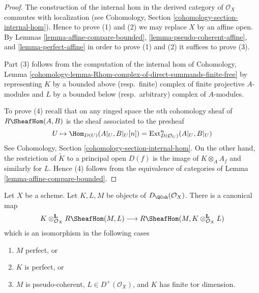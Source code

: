 \begin{proof}
The construction of the internal hom in the derived category of
$\mathcal{O}_X$ commutes with localization (see
Cohomology, Section \ref{cohomology-section-internal-hom}).
Hence to prove (1) and (2) we may replace $X$ by an affine open.
By Lemmas \ref{lemma-affine-compare-bounded},
\ref{lemma-pseudo-coherent-affine}, and
\ref{lemma-perfect-affine}
in order to prove (1) and (2) it suffices to prove (3).

\medskip\noindent
Part (3) follows from the computation of the
internal hom of Cohomology, Lemma
\ref{cohomology-lemma-Rhom-complex-of-direct-summands-finite-free}
by representing $K$ by a bounded above (resp.\ finite) complex of
finite projective $A$-modules and $L$ by a bounded below
(resp.\ arbitrary) complex of $A$-modules.

\medskip\noindent
To prove (4) recall that on any ringed space the $n$th cohomology sheaf of
$R\SheafHom(A, B)$ is the sheaf associated to the presheaf
$$
U \mapsto \Hom_{D(U)}(A|_U, B|_U[n]) =
\text{Ext}^n_{D(\mathcal{O}_U)}(A|_U, B|_U)
$$
See Cohomology, Section \ref{cohomology-section-internal-hom}.
On the other hand, the restriction of $\widetilde{K}$ to a principal
open $D(f)$ is the image of $K \otimes_A A_f$ and similarly for $L$.
Hence (4) follows from the equivalence of categories of
Lemma \ref{lemma-affine-compare-bounded}.
\end{proof}

\begin{lemma}
\label{lemma-internal-hom-evaluate-tensor-isomorphism}
Let $X$ be a scheme. Let $K, L, M$ be objects of $D_\QCoh(\mathcal{O}_X)$.
There is a canonical map
$$
K \otimes_{\mathcal{O}_X}^\mathbf{L} R\SheafHom(M, L)
\longrightarrow
R\SheafHom(M, K \otimes_{\mathcal{O}_X}^\mathbf{L} L)
$$
which is an isomorphism in the following cases
\begin{enumerate}
\item $M$ perfect, or
\item $K$ is perfect, or
\item $M$ is pseudo-coherent, $L \in D^+(\mathcal{O}_X)$, and $K$ has finite
tor dimension.
\end{enumerate}
\end{lemma}

